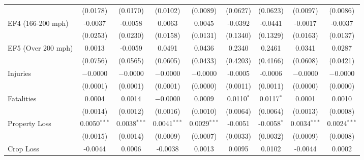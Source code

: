 \documentclass[letterpaper]{article}
\begin{document}
\begin{table}[H]
\begin{tabular}{lcccccccc}
                   & (0.0178)               & (0.0170)               & (0.0102)               & (0.0089)                & (0.0627)     & (0.0623)        & (0.0097)                & (0.0086)\\   
   EF4 (166-200 mph) & -0.0037                & -0.0058                & 0.0063                 & 0.0045                  & -0.0392      & -0.0441         & -0.0017                 & -0.0037\\   
                   & (0.0253)               & (0.0230)               & (0.0158)               & (0.0131)                & (0.1340)     & (0.1329)        & (0.0163)                & (0.0137)\\   
   EF5 (Over 200 mph) & 0.0013                 & -0.0059                & 0.0491                 & 0.0436                  & 0.2340       & 0.2461          & 0.0341                  & 0.0287\\   
                   & (0.0756)               & (0.0565)               & (0.0605)               & (0.0433)                & (0.4203)     & (0.4166)        & (0.0608)                & (0.0421)\\   
   Injuries             & $-0.0000$  & $-0.0000$  & $-0.0000$  & $-0.0000$    & -0.0005      & -0.0006         & $-0.0000$   & $-0.0000$\\    
                   & (0.0001)               & (0.0001)               & (0.0001)               & (0.0000)  & (0.0011)     & (0.0011)        & (0.0000)  & (0.0000)\\    
   Fatalities             & 0.0004                 & 0.0014                 & $-0.0000$  & 0.0009                  & 0.0110$^{*}$ & 0.0117$^{*}$    & 0.0001                  & 0.0010\\   
                   & (0.0014)               & (0.0012)               & (0.0016)               & (0.0010)                & (0.0064)     & (0.0064)        & (0.0013)                & (0.0008)\\   
   Property Loss            & 0.0050$^{***}$         & 0.0038$^{***}$         & 0.0041$^{***}$         & 0.0029$^{***}$          & -0.0051      & -0.0058$^{*}$   & 0.0034$^{***}$          & 0.0024$^{***}$\\   
                   & (0.0015)               & (0.0014)               & (0.0009)               & (0.0007)                & (0.0033)     & (0.0032)        & (0.0009)                & (0.0008)\\   
   Crop Loss           & -0.0044                & 0.0006                 & -0.0038                & 0.0013                  & 0.0095       & 0.0102          & -0.0044                 & 0.0002\\   

\end{tabular}
\end{table}
\end{document}
